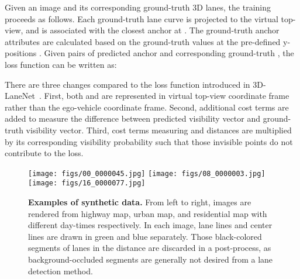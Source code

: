 \documentclass[10pt,twocolumn,letterpaper]{article}
\begin{document}
Given an image and its corresponding ground-truth 3D lanes, the training proceeds as follows. Each ground-truth lane curve is projected to the virtual top-view, and is associated with the closest anchor at . The ground-truth anchor attributes are calculated based on the ground-truth values at the pre-defined y-positions . Given pairs of predicted anchor  and corresponding ground-truth , the loss function can be written as:
{\small

}

There are three changes compared to the loss function introduced in 3D-LaneNet~\cite{Garnett:etal:ICCV2019}. First, both  and  are represented in virtual top-view coordinate frame rather than the ego-vehicle coordinate frame. Second, additional cost terms are added to measure the difference between predicted visibility vector and ground-truth visibility vector. Third, cost terms measuring  and  distances are multiplied by its corresponding visibility probability  such that those invisible points do not contribute to the loss. 




\begin{figure*}[!h]
  \centering
  \texttt{[image: figs/00\_0000045.jpg]}
  \texttt{[image: figs/08\_0000003.jpg]}
  \texttt{[image: figs/16\_0000077.jpg]}
\caption{\textbf{Examples of synthetic data.} From left to right, images are rendered from  highway map, urban map, and residential map with different day-times respectively. In each image, lane lines and center lines are drawn in green and blue separately. Those black-colored segments of lanes in the distance are discarded in a post-process, as background-occluded segments are generally not desired from a lane detection method.}
  \label{fig:simu:example}
\end{figure*}

\begin{comment}
\begin{figure}[!h]
  \centering
  \texttt{[image: figs/00\_0000045.jpg]}
  \texttt{[image: figs/08\_0000003.jpg]}
\caption{\textbf{Examples of synthetic data.} Images are rendered from different terrain maps and with different day-times respectively. In each image, lane lines and center lines are drawn in green and blue separately. Those background-occluded segments of lanes in the distance (black) are discarded in a post-process.}
  \label{fig:simu:example}
\end{figure}
\end{comment}
\end{document}
